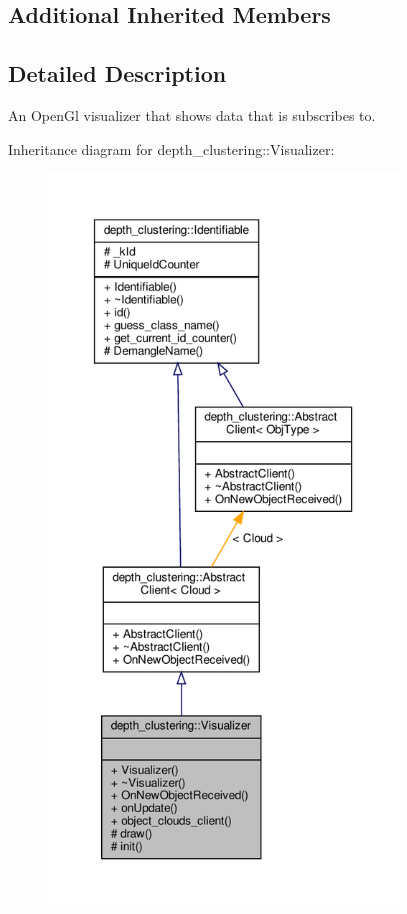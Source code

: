 \subsection*{Additional Inherited Members}


\subsection{Detailed Description}
An Open\+Gl visualizer that shows data that is subscribes to. 

Inheritance diagram for depth\+\_\+clustering\+:\+:Visualizer\+:\nopagebreak
\begin{figure}[H]
\begin{center}
\leavevmode
\includegraphics[height=550pt]{classdepth__clustering_1_1Visualizer__inherit__graph}
\end{center}
\end{figure}


